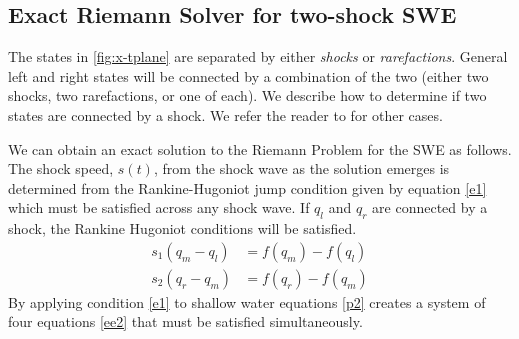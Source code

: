\documentclass[12pt,a4paper]{article}
\begin{document}
	
	\subsection{Exact Riemann Solver for two-shock SWE}
	The states in \ref{fig:x-tplane} are separated by either {\em shocks} or {\em rarefactions}. General left and right states will be connected by a combination of the two (either two shocks, two rarefactions, or one of each).  We describe how to determine if two states are connected by a shock.  We refer the reader to \cite{leveque2002finite} for other cases. 
	
	We can obtain an exact solution to the Riemann Problem for the SWE as follows. 
	The shock speed, $s(t)$,  from the shock wave as the solution emerges is determined from the Rankine-Hugoniot jump condition given by equation \eqref{e1}  which must be satisfied across any shock wave.  If $q_l$ and $q_r$ are connected by a shock, the Rankine Hugoniot conditions will be satisfied\cite{ma-ah-be-ca-ge-ha-ke-le-le:2016}. 
	\begin{equation}
		\begin{aligned}
			s_1(q_{m} - q_{l}) & = f(q_{m}) - f(q_{l}) \\
			s_2(q_{r} - q_{m}) & = f(q_{r}) - f(q_{m})
		\end{aligned}
		\label{e1}
	\end{equation}
	By applying condition  \eqref{e1} to shallow water equations \eqref{p2}  creates a system of four equations \eqref{ee2} that must be satisfied simultaneously. 
		
\end{document}
